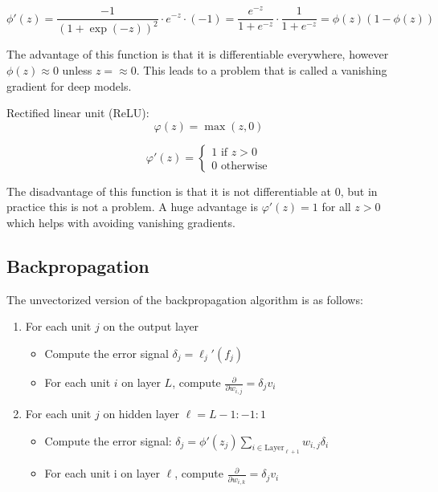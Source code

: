 \documentclass[a4paper,10pt,twoside]{article}
\begin{document}
\begin{equation*}
    \phi'(z)=\frac{-1}{(1+\exp(-z))^2}\cdot e^{-z}\cdot (-1)=\frac{e^{-z}}{1+e^{-z}}\cdot\frac{1}{1+e^{-z}}=\phi(z)(1-\phi(z))
\end{equation*}

The advantage of this function is that it is differentiable everywhere, however $\phi(z)\approx 0$ unless $z=\approx 0$. This leads to a problem that is called a vanishing gradient for deep models. 

Rectified linear unit (ReLU):
\begin{equation*}
    \varphi(z)=\max(z,0)
\end{equation*}

\begin{equation*}
    \varphi'(z)=\begin{cases}
        1 \text{ if }z>0\\
        0 \text{ otherwise}
    \end{cases}
\end{equation*}

The disadvantage of this function is that it is not differentiable at 0, but in practice this is not a problem. A huge advantage is $\varphi'(z)=1$ for all $z>0$ which helps with avoiding vanishing gradients.

\subsection{Backpropagation}
The unvectorized version of the backpropagation algorithm is as follows:
\begin{enumerate}
    \item For each unit $j$ on the output layer
    \begin{itemize}
        \item Compute the error signal $\delta_j=\ell_j'(f_j)$
        \item For each unit $i$ on layer $L$, compute $\frac{\partial}{\partial w_{i,j}}=\delta_jv_i$
    \end{itemize}
    \item For each unit $j$ on hidden layer $\ell=L-1:-1:1$
    \begin{itemize}
        \item Compute the error signal: $\delta_j=\phi'(z_j)\sum_{i\in\text{Layer}_{\ell+1}}w_{i,j}\delta_i$
        \item For each unit i on layer $\ell$, compute $\frac{\partial}{\partial w_{i,k}}=\delta_{j}v_i$
    \end{itemize}
\end{enumerate}
\end{document}
